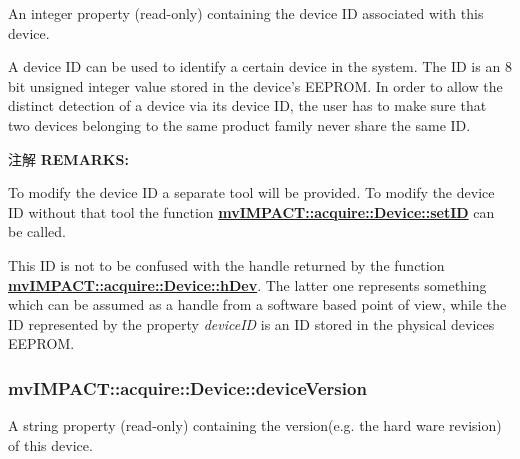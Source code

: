 An integer property {\bfseries }(read-\/only) containing the device I\+D associated with this device. 

A device I\+D can be used to identify a certain device in the system. The I\+D is an 8 bit unsigned integer value stored in the device's E\+E\+P\+R\+O\+M. In order to allow the distinct detection of a device via its device I\+D, the user has to make sure that two devices belonging to the same product family never share the same I\+D.

\begin{DoxyNote}{注解}
{\bfseries R\+E\+M\+A\+R\+K\+S\+:} 


\begin{DoxyItemize}
\item To modify the device I\+D a separate tool will be provided. To modify the device I\+D without that tool the function {\bfseries \hyperlink{classmv_i_m_p_a_c_t_1_1acquire_1_1_device_a3cf73e03bb07320488a703a573f043ac}{mv\+I\+M\+P\+A\+C\+T\+::acquire\+::\+Device\+::set\+I\+D}} can be called.
\item This I\+D is not to be confused with the handle returned by the function {\bfseries \hyperlink{classmv_i_m_p_a_c_t_1_1acquire_1_1_device_a73fb3a8ac92b197700f04e1df9c250e7}{mv\+I\+M\+P\+A\+C\+T\+::acquire\+::\+Device\+::h\+Dev}}. The latter one represents something which can be assumed as a handle from a software based point of view, while the I\+D represented by the property {\itshape device\+I\+D} is an I\+D stored in the physical devices E\+E\+P\+R\+O\+M. 
\end{DoxyItemize}
\end{DoxyNote}
\hypertarget{classmv_i_m_p_a_c_t_1_1acquire_1_1_device_a52f3dd5742f14fff0c6fabeae0ccaee1}{
\subsubsection[{device\+Version}]{ mv\+I\+M\+P\+A\+C\+T\+::acquire\+::\+Device\+::device\+Version}}\label{classmv_i_m_p_a_c_t_1_1acquire_1_1_device_a52f3dd5742f14fff0c6fabeae0ccaee1}


A string property {\bfseries }(read-\/only) containing the version(e.\+g. the hard ware revision) of this device. 

